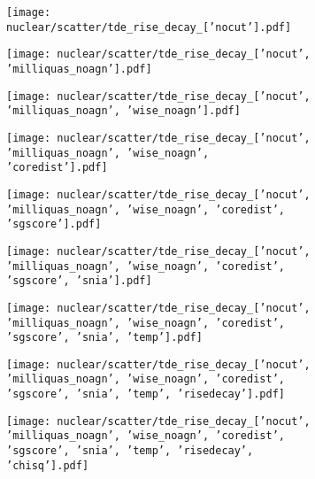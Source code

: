 \begin{figure}[htb]
    \centering
    \begin{subfigure}[b]{0.49\textwidth}
        \centering
        \texttt{[image: nuclear/scatter/tde\_rise\_decay\_['nocut'].pdf]}
    \end{subfigure}
    \begin{subfigure}[b]{0.49\textwidth}
        \centering
        \texttt{[image: nuclear/scatter/tde\_rise\_decay\_['nocut', 'milliquas\_noagn'].pdf]}
    \end{subfigure}
    \begin{subfigure}[b]{0.49\textwidth}
        \centering
        \texttt{[image: nuclear/scatter/tde\_rise\_decay\_['nocut', 'milliquas\_noagn', 'wise\_noagn'].pdf]}
    \end{subfigure}
    \begin{subfigure}[b]{0.49\textwidth}
        \centering
        \texttt{[image: nuclear/scatter/tde\_rise\_decay\_['nocut', 'milliquas\_noagn', 'wise\_noagn', 'coredist'].pdf]}
    \end{subfigure}
    \begin{subfigure}[b]{0.49\textwidth}
        \centering
        \texttt{[image: nuclear/scatter/tde\_rise\_decay\_['nocut', 'milliquas\_noagn', 'wise\_noagn', 'coredist', 'sgscore'].pdf]}
    \end{subfigure}
    \begin{subfigure}[b]{0.49\textwidth}
        \centering
        \texttt{[image: nuclear/scatter/tde\_rise\_decay\_['nocut', 'milliquas\_noagn', 'wise\_noagn', 'coredist', 'sgscore', 'snia'].pdf]}
    \end{subfigure}
    \begin{subfigure}[b]{0.49\textwidth}
        \centering
        \texttt{[image: nuclear/scatter/tde\_rise\_decay\_['nocut', 'milliquas\_noagn', 'wise\_noagn', 'coredist', 'sgscore', 'snia', 'temp'].pdf]}
    \end{subfigure}
    \begin{subfigure}[b]{0.49\textwidth}
        \centering
        \texttt{[image: nuclear/scatter/tde\_rise\_decay\_['nocut', 'milliquas\_noagn', 'wise\_noagn', 'coredist', 'sgscore', 'snia', 'temp', 'risedecay'].pdf]}
    \end{subfigure}
    \begin{subfigure}[b]{0.49\textwidth}
        \centering
        \texttt{[image: nuclear/scatter/tde\_rise\_decay\_['nocut', 'milliquas\_noagn', 'wise\_noagn', 'coredist', 'sgscore', 'snia', 'temp', 'risedecay', 'chisq'].pdf]}

\end{subfigure}
\end{figure}
